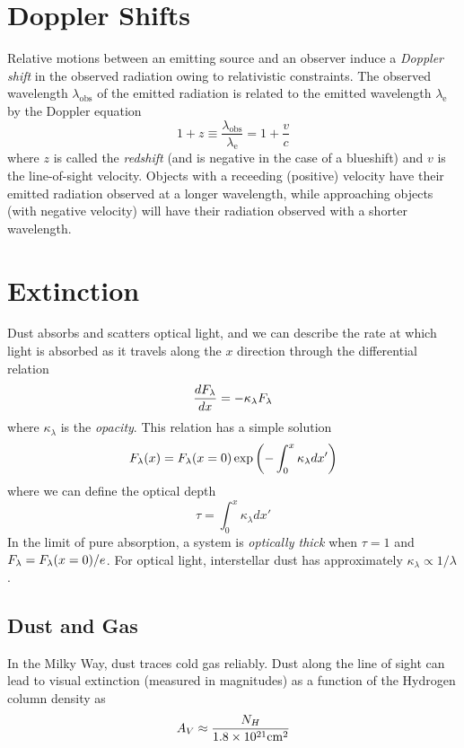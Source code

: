 \documentclass[12pt]{article}
\begin{document}
\section{Doppler Shifts}

Relative motions between an emitting source and an observer
induce a {\it Doppler shift} in the observed radiation owing
to relativistic constraints. The observed wavelength 
$\lambda_{\mathrm{obs}}$ of the emitted radiation is
related to the emitted wavelength $\lambda_{\mathrm{e}}$
by the Doppler equation
\begin{equation}
1+z \equiv \frac{\lambda_{\mathrm{obs}} }{\lambda_{\mathrm{e}} } = 1+\frac{v}{c}
\end{equation}
\noindent
where $z$ is called the {\it redshift} 
(and is negative in the case of a blueshift) and $v$ is the
line-of-sight velocity.
Objects with a receeding (positive) velocity have their
emitted radiation observed at a longer wavelength, while
approaching objects (with negative velocity) will have their
radiation observed with a shorter wavelength.

\section{Extinction}

Dust absorbs and scatters optical light, and we can describe
the rate at which light is absorbed as it travels along the
$x$ direction through the differential relation
\begin{equation}
\frac{dF_{\lambda}}{dx} = - \kappa_{\lambda} F_{\lambda}
\end{equation}
\noindent
where $\kappa_{\lambda}$ is the {\it opacity}. This relation
has a simple solution
\begin{equation}
F_{\lambda}(x) = F_{\lambda}(x=0)\exp\left(-\int_{0}^{x} \kappa_{\lambda} dx'\right)
\end{equation}
\noindent
where we can define the optical depth
\begin{equation}
\tau = \int_{0}^{x} \kappa_{\lambda} dx'
\end{equation}
\noindent
In the limit of pure absorption, a system is {\it optically thick}
when $\tau = 1$ and $F_{\lambda} = F_{\lambda}(x=0)/e$. For
optical light, interstellar dust has approximately $\kappa_{\lambda}\propto1/\lambda$.

\subsection{Dust and Gas}
In the Milky Way, dust traces cold gas reliably. Dust along the
line of sight can lead to visual extinction (measured in magnitudes)
as a function of the Hydrogen column density as
\begin{equation}
A_{V} \approx \frac{N_{H}}{1.8\times10^{21}\mathrm{cm}^{2}} 
\end{equation}
\end{document}
